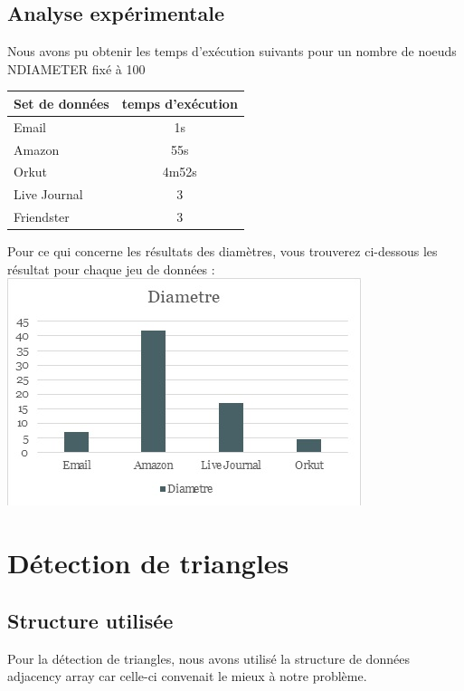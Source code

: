 \documentclass[a4paper,10pt]{report}
\begin{document}
\subsection{Analyse expérimentale}
Nous avons pu obtenir les temps d'exécution suivants pour un nombre de noeuds NDIAMETER fixé à 100
\begin{center}
    \begin{tabular}{|l|c|}
    \hline
     Set de données & temps d'exécution\\ \hline
     Email & 1s\\ 
     Amazon & 55s\\ 
     Orkut & 4m52s \\
     Live Journal & 3\\ 
     Friendster & 3\\ 
     \hline
    \end{tabular}
\end{center}
Pour ce qui concerne les résultats des diamètres, vous trouverez ci-dessous les résultat pour chaque jeu de données :
\newline
\includegraphics[scale=0.9]{./Datas/diagrammeDiametres.jpg}
\section{Détection de triangles}
\subsection{Structure utilisée}
Pour la détection de triangles, nous avons utilisé la structure de données adjacency array car celle-ci convenait le mieux à notre problème.
\\
\end{document}

